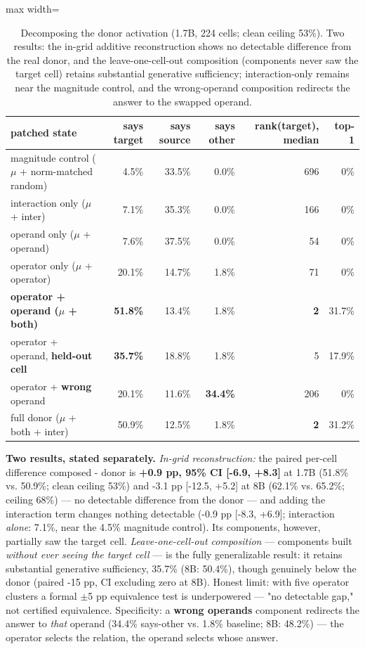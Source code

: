 {
\begin{table}[t]
\centering\small
\setlength{\tabcolsep}{4pt}
\begin{adjustbox}{max width=\textwidth}
\begin{tabular}{lrrrrr}
\toprule
patched state & says target & says source & says other & rank(target),
median & top-1 \\
\midrule
magnitude control (\ensuremath{\mu} + norm-matched random) & 4.5\% & 33.5\% & 0.0\% &
696 & 0\% \\
interaction only (\ensuremath{\mu} + inter) & 7.1\% & 35.3\% & 0.0\% & 166 & 0\% \\
operand only (\ensuremath{\mu} + operand) & 7.6\% & 37.5\% & 0.0\% & 54 & 0\% \\
operator only (\ensuremath{\mu} + operator) & 20.1\% & 14.7\% & 1.8\% & 71 & 0\% \\
\textbf{operator + operand (\ensuremath{\mu} + both)} & \textbf{51.8\%} & 13.4\% &
1.8\% & \textbf{2} & 31.7\% \\
operator + operand, \textbf{held-out cell} & \textbf{35.7\%} & 18.8\% &
1.8\% & 5 & 17.9\% \\
operator + \textbf{wrong} operand & 20.1\% & 11.6\% & \textbf{34.4\%} &
206 & 0\% \\
full donor (\ensuremath{\mu} + both + inter) & 50.9\% & 12.5\% & 1.8\% & \textbf{2} &
31.2\% \\
\bottomrule
\end{tabular}
\end{adjustbox}
\caption{Decomposing the donor activation (1.7B, 224 cells; clean ceiling 53\%). Two results: the in-grid additive reconstruction shows no detectable difference from the real donor, and the leave-one-cell-out composition (components never saw the target cell) retains substantial generative sufficiency; interaction-only remains near the magnitude control, and the wrong-operand composition redirects the answer to the swapped operand.}
\end{table}
}

\textbf{Two results, stated separately.} \emph{In-grid reconstruction:}
the paired per-cell difference composed - donor is \textbf{+0.9 pp, 95\%
CI {[}-6.9, +8.3{]}} at 1.7B (51.8\% vs. 50.9\%; clean ceiling 53\%) and
-3.1 pp {[}-12.5, +5.2{]} at 8B (62.1\% vs. 65.2\%; ceiling 68\%) --- no
detectable difference from the donor --- and adding the interaction term
changes nothing detectable (-0.9 pp {[}-8.3, +6.9{]}; interaction
\emph{alone}: 7.1\%, near the 4.5\% magnitude control). Its components,
however, partially saw the target cell. \emph{Leave-one-cell-out
composition} --- components built \emph{without ever seeing the target
cell} --- is the fully generalizable result: it retains substantial
generative sufficiency, 35.7\% (8B: 50.4\%), though genuinely below the
donor (paired -15 pp, CI excluding zero at 8B). Honest limit: with five
operator clusters a formal \ensuremath{\pm}5 pp equivalence test is underpowered ---
"no detectable gap," not certified equivalence. Specificity: a
\textbf{wrong operand\textquotesingle s} component redirects the answer
to \emph{that} operand (34.4\% says-other vs. 1.8\% baseline; 8B:
48.2\%) --- the operator selects the relation, the operand selects whose
answer.

